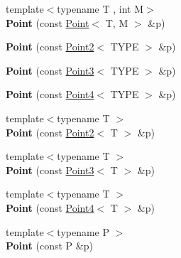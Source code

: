 \begin{Indent}
\begin{DoxyCompactItemize}
\mbox{\label{classcy_1_1_point_a2bdf7acf97ca5a5ece4ad49d60998fda}} 
{\footnotesize template$<$typename T , int M$>$ }\\{\bfseries Point} (const \mbox{\hyperlink{classcy_1_1_point}{Point}}$<$ T, M $>$ \&p)
\item 
\mbox{\label{classcy_1_1_point_a0d6b8b158344022e183ebcfda721834c}} 
{\bfseries Point} (const \mbox{\hyperlink{classcy_1_1_point2}{Point2}}$<$ T\+Y\+PE $>$ \&p)
\item 
\mbox{\label{classcy_1_1_point_a04f6357cdf3a445a17a87516619a5440}} 
{\bfseries Point} (const \mbox{\hyperlink{classcy_1_1_point3}{Point3}}$<$ T\+Y\+PE $>$ \&p)
\item 
\mbox{\label{classcy_1_1_point_a59db644b492faa4c46b5da1b9203026c}} 
{\bfseries Point} (const \mbox{\hyperlink{classcy_1_1_point4}{Point4}}$<$ T\+Y\+PE $>$ \&p)
\item 
\mbox{\label{classcy_1_1_point_ae439633d243b10398c795b55facddc61}} 
{\footnotesize template$<$typename T $>$ }\\{\bfseries Point} (const \mbox{\hyperlink{classcy_1_1_point2}{Point2}}$<$ T $>$ \&p)
\item 
\mbox{\label{classcy_1_1_point_a101988c6911e167f60a39b7525d8185b}} 
{\footnotesize template$<$typename T $>$ }\\{\bfseries Point} (const \mbox{\hyperlink{classcy_1_1_point3}{Point3}}$<$ T $>$ \&p)
\item 
\mbox{\label{classcy_1_1_point_a5c1b6a2bbc02b14bfb9b307b3c52f498}} 
{\footnotesize template$<$typename T $>$ }\\{\bfseries Point} (const \mbox{\hyperlink{classcy_1_1_point4}{Point4}}$<$ T $>$ \&p)
\item 
\mbox{\label{classcy_1_1_point_a0ac5141a84a4816aaba2e128922f065b}} 
{\footnotesize template$<$typename P $>$ }\\{\bfseries Point} (const P \&p)
\end{DoxyCompactItemize}
\end{Indent}
